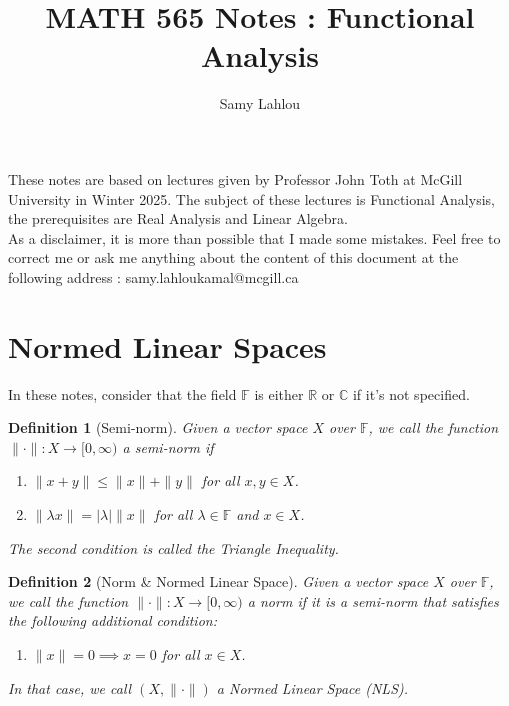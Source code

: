 \documentclass{article}
\title{MATH 565 Notes : Functional Analysis}
\author{Samy Lahlou}
\date{}
\newtheorem*{definition}{Definition}
\newcommand{\C}{\mathbb{C}}
\newcommand{\R}{\mathbb{R}}
\newcommand{\F}{\mathbb{F}}
\begin{document}
\maketitle

These notes are based on lectures given by Professor John Toth at McGill University in Winter 2025. The subject of these lectures is Functional Analysis, the prerequisites are Real Analysis and Linear Algebra. \\
As a disclaimer, it is more than possible that I made some mistakes. Feel free to correct me or ask me anything about the content of this document at the following address : samy.lahloukamal@mcgill.ca

\tableofcontents

\newpage

\section{Normed Linear Spaces}

In these notes, consider that the field $\F$ is either $\R$ or $\C$ if it's not specified.

\begin{definition}[Semi-norm]
    Given a vector space $X$ over $\F$, we call the function $\|\cdot\| : X \to [0, \infty)$ a semi-norm if
    \begin{enumerate}
        \item $\|x + y\| \leq \|x\| + \|y\|$ for all $x,y\in X$.
        \item $\|\lambda x\| = |\lambda| \|x\|$ for all $\lambda \in \F$ and $x \in X$.
    \end{enumerate}
    The second condition is called the \textit{Triangle Inequality}.
\end{definition}

\begin{definition}[Norm \& Normed Linear Space]
    Given a vector space $X$ over $\F$, we call the function $\|\cdot\| : X \to [0, \infty)$ a norm if it is a semi-norm that satisfies the following additional condition: 
    \begin{enumerate}
        \item $\|x\| = 0 \implies x = 0$ for all $x\in X$.
    \end{enumerate}
    In that case, we call $(X, \|\cdot\|)$ a Normed Linear Space (NLS).
\end{definition}
\end{document}
